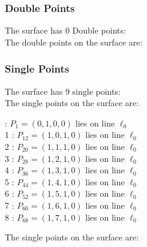 \documentclass{article}
\begin{document}
{\subsubsection*{Double Points}
The surface has 0 Double points:\\
The double points on the surface are:\\
\begin{multicols}{2}
\noindent
\end{multicols}
\subsubsection*{Single Points}
The surface has 9 single points:\\
The single points on the surface are:\\
\begin{multicols}{2}
 : $P_{1}=( 0, 1, 0, 0 )$ lies on line $\ell_{0}$\\
1 : $P_{12}=( 1, 0, 1, 0 )$ lies on line $\ell_{0}$\\
2 : $P_{20}=( 1, 1, 1, 0 )$ lies on line $\ell_{0}$\\
3 : $P_{28}=( 1, 2, 1, 0 )$ lies on line $\ell_{0}$\\
4 : $P_{36}=( 1, 3, 1, 0 )$ lies on line $\ell_{0}$\\
5 : $P_{44}=( 1, 4, 1, 0 )$ lies on line $\ell_{0}$\\
6 : $P_{52}=( 1, 5, 1, 0 )$ lies on line $\ell_{0}$\\
7 : $P_{60}=( 1, 6, 1, 0 )$ lies on line $\ell_{0}$\\
8 : $P_{68}=( 1, 7, 1, 0 )$ lies on line $\ell_{0}$\\
\end{multicols}
The single points on the surface are:\\
}
\end{document}
